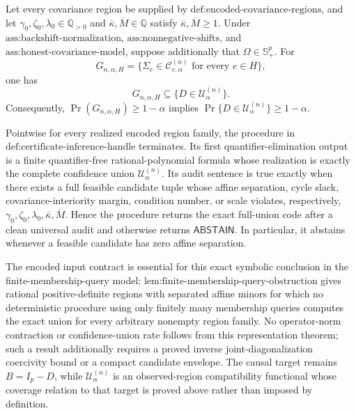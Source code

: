 Let every covariance region be supplied by \(\text{def:encoded-covariance-regions}\), and let \(\gamma_0,\zeta_0,\lambda_0\in\mathbb Q_{>0}\) and \(\overline\kappa,\overline M\in\mathbb Q\) satisfy \(\overline\kappa,\overline M\geq1\). Under \(\text{ass:backshift-normalization}\), \(\text{ass:nonnegative-shifts}\), and \(\text{ass:honest-covariance-model}\), suppose additionally that \(\Omega\in\mathbb S_+^p\). For
\[
G_{n,\alpha,H}=\{\Sigma_e\in\mathcal C^{(n)}_{e,\alpha}\text{ for every }e\in H\},
\]
one has
\[
G_{n,\alpha,H}\subseteq\{D\in\mathcal U^{(n)}_\alpha\}.
\]
Consequently, \(\Pr(G_{n,\alpha,H})\geq1-\alpha\) implies \(\Pr\{D\in\mathcal U^{(n)}_\alpha\}\geq1-\alpha\).

Pointwise for every realized encoded region family, the procedure in \(\text{def:certificate-inference-handle}\) terminates. Its first quantifier-elimination output is a finite quantifier-free rational-polynomial formula whose realization is exactly the complete confidence union \(\mathcal U^{(n)}_\alpha\). Its audit sentence is true exactly when there exists a full feasible candidate tuple whose affine separation, cycle slack, covariance-interiority margin, condition number, or scale violates, respectively, \(\gamma_0,\zeta_0,\lambda_0,\overline\kappa,\overline M\). Hence the procedure returns the exact full-union code after a clean universal audit and otherwise returns \(\mathsf{ABSTAIN}\). In particular, it abstains whenever a feasible candidate has zero affine separation.

The encoded input contract is essential for this exact symbolic conclusion in the finite-membership-query model: \(\text{lem:finite-membership-query-obstruction}\) gives rational positive-definite regions with separated affine minors for which no deterministic procedure using only finitely many membership queries computes the exact union for every arbitrary nonempty region family. No operator-norm contraction or confidence-union rate follows from this representation theorem; such a result additionally requires a proved inverse joint-diagonalization coercivity bound or a compact candidate envelope. The causal target remains \(B=I_p-D\), while \(\mathcal U^{(n)}_\alpha\) is an observed-region compatibility functional whose coverage relation to that target is proved above rather than imposed by definition.